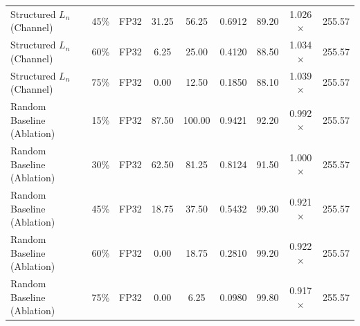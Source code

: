 \begin{table}[!t]
{\begin{tabular}{lcccccccc}
Structured $L_n$ (Channel) & 45\% & FP32 & 31.25 & 56.25 & 0.6912 & 89.20 & 1.026$\times$ & 255.57 \\
Structured $L_n$ (Channel) & 60\% & FP32 & 6.25 & 25.00 & 0.4120 & 88.50 & 1.034$\times$ & 255.57 \\
Structured $L_n$ (Channel) & 75\% & FP32 & 0.00 & 12.50 & 0.1850 & 88.10 & 1.039$\times$ & 255.57 \\
\hline
Random Baseline (Ablation) & 15\% & FP32 & 87.50 & 100.00 & 0.9421 & 92.20 & 0.992$\times$ & 255.57 \\
Random Baseline (Ablation) & 30\% & FP32 & 62.50 & 81.25 & 0.8124 & 91.50 & 1.000$\times$ & 255.57 \\
Random Baseline (Ablation) & 45\% & FP32 & 18.75 & 37.50 & 0.5432 & 99.30 & 0.921$\times$ & 255.57 \\
Random Baseline (Ablation) & 60\% & FP32 & 0.00 & 18.75 & 0.2810 & 99.20 & 0.922$\times$ & 255.57 \\
Random Baseline (Ablation) & 75\% & FP32 & 0.00 & 6.25 & 0.0980 & 99.80 & 0.917$\times$ & 255.57 \\
\hline
\end{tabular}%
}
\end{table}

